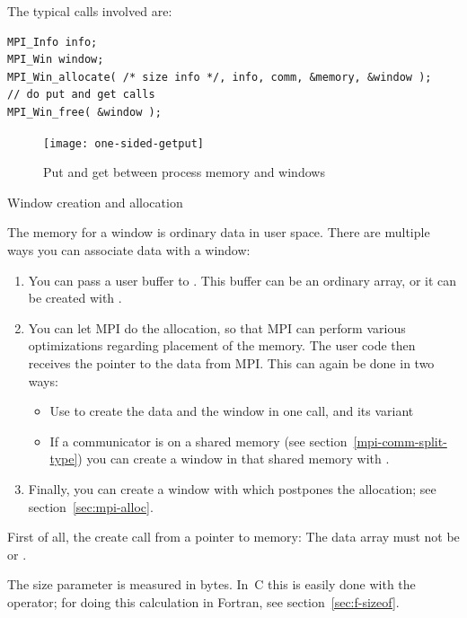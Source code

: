 
The typical calls involved are:
\lstset{style=reviewcode,language=C}
\begin{lstlisting}
MPI_Info info;
MPI_Win window;
MPI_Win_allocate( /* size info */, info, comm, &memory, &window );
// do put and get calls
MPI_Win_free( &window );
\end{lstlisting}

\begin{figure}[ht]
  \texttt{[image: one-sided-getput]}
  \caption{Put and get between process memory and windows}
  \label{fig:putget}
\end{figure}

 {Window creation and allocation}
\label{sec:win-alloc}

The memory for a window is ordinary data in user space. There are multiple
ways you can associate data with a window:
\begin{enumerate}
\item You can pass a user buffer to
  . This buffer can be an ordinary array,
  or it can be created with .
\item You can let MPI do the allocation, so that MPI can perform various
  optimizations regarding placement of the memory. The user code then
  receives the pointer to the data from MPI. This can again be done in two ways:
  \begin{itemize}
  \item Use  to create the data and the
    window in one call, and its variant
  \item If a communicator is on a shared memory (see
    section~\ref{mpi-comm-split-type}) you can create a window in that
    shared memory with .
  \end{itemize}
\item Finally, you can create a window with
   which postpones the allocation;
  see section~\ref{sec:mpi-alloc}.
\end{enumerate}

First of all, the create call from a pointer to memory:
%
%
The data array must not be  or .

The size parameter is measured in bytes. In~C this is easily done
with the  operator;
for doing this calculation in Fortran, see section~\ref{sec:f-sizeof}.

